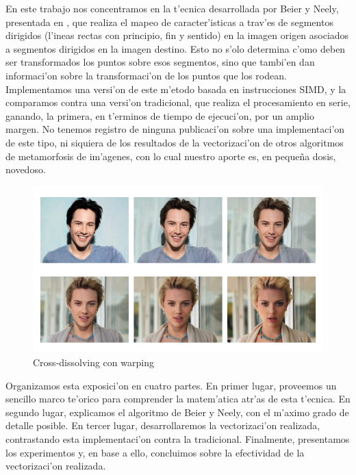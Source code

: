 En este trabajo nos concentramos en la t'ecnica desarrollada por Beier y Neely, presentada en \cite{beier92}, que realiza el mapeo de caracter'isticas a trav'es de segmentos dirigidos (l'ineas rectas con principio, fin y sentido) en la imagen origen asociados a segmentos dirigidos en la imagen destino. Esto no s'olo determina c'omo deben ser transformados los puntos sobre esos segmentos, sino que tambi'en dan informaci'on sobre la transformaci'on de los puntos que los rodean. Implementamos una versi'on de este m'etodo basada en instrucciones SIMD, y la comparamos contra una versi'on tradicional, que realiza el procesamiento en serie, ganando, la primera, en t'erminos de tiempo de ejecuci'on, por un amplio margen. No tenemos registro de ninguna publicaci'on sobre una implementaci'on de este tipo, ni siquiera de los resultados de la vectorizaci'on de otros algoritmos de metamorfosis de im'agenes, con lo cual nuestro aporte es, en peque\~{n}a dosis, novedoso.

\begin{figure}[H]
	\begin{center}
		\includegraphics[scale=0.65]{imagenes/warping.png}
	\end{center}		
	\caption{Cross-dissolving con warping}
	\label{fig2}
\end{figure}

Organizamos esta exposici'on en cuatro partes. En primer lugar, proveemos un sencillo marco te'orico para comprender la matem'atica atr'as de esta t'ecnica. En segundo lugar, explicamos el algoritmo de Beier y Neely, con el m'aximo grado de detalle posible. En tercer lugar, desarrollaremos la vectorizaci'on realizada, contrastando esta implementaci'on contra la tradicional. Finalmente, presentamos los experimentos y, en base a ello, concluimos sobre la efectividad de la vectorizaci'on realizada.